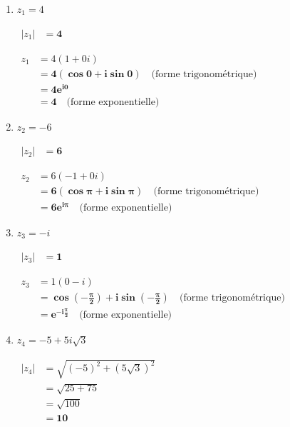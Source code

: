 \documentclass[12pt,a4paper]{article}
\begin{document}
\begin{enumerate}
    \item $z_1 = 4$
    
    $
    \begin{aligned}
        |z_1| &= \mathbf{4}
    \end{aligned}
    $
    
    $
    \begin{aligned}
        z_1 &= 4(1 + 0i)\\
        &= \mathbf{4(\cos 0 + i\sin 0)} \quad \text{(forme trigonométrique)}\\
        &= \mathbf{4e^{i0}}\\ 
        &= \mathbf{4} \quad \text{(forme exponentielle)}
    \end{aligned}
    $

    \item $z_2 = -6$
    
    $
    \begin{aligned}
        |z_2| &= \mathbf{6}
    \end{aligned}
    $
    
    $
    \begin{aligned}
        z_2 &= 6(-1 + 0i)\\
        &= \mathbf{6(\cos\pi + i\sin\pi)} \quad \text{(forme trigonométrique)}\\
        &= \mathbf{6e^{i\pi}} \quad \text{(forme exponentielle)}
    \end{aligned}
    $

    \item $z_3 = -i$
    
    $
    \begin{aligned}
        |z_3| &= \mathbf{1}
    \end{aligned}
    $
    
    $
    \begin{aligned}
        z_3 &= 1(0 - i)\\
        &= \mathbf{\cos\left(-\frac{\pi}{2}\right) + i\sin\left(-\frac{\pi}{2}\right)} \quad \text{(forme trigonométrique)}\\
        &= \mathbf{e^{-i\frac{\pi}{2}}} \quad \text{(forme exponentielle)}
    \end{aligned}
    $

    \item $z_4 = -5 + 5i\sqrt{3}$
    
    $
    \begin{aligned}
        |z_4| &= \sqrt{(-5)^2 + (5\sqrt{3})^2}\\
        &= \sqrt{25 + 75}\\
        &= \sqrt{100}\\
        &= \mathbf{10}
    \end{aligned}
    $
    

\end{enumerate}
\end{document}
